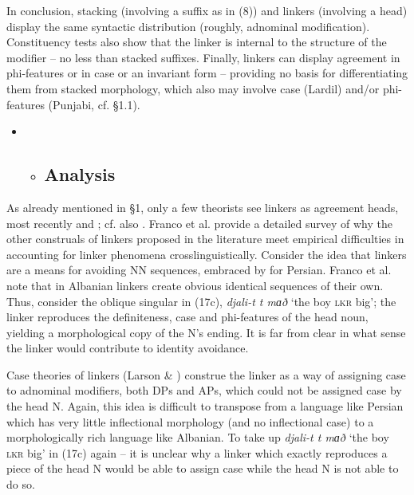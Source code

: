 \documentclass[output=paper]{langsci/langscibook}
\begin{document}
\begin{styleSfondomedioiColorexxi}
In conclusion, stacking (involving a suffix as in (8)) and linkers (involving a head) display the same syntactic distribution (roughly, adnominal modification). Constituency tests also show that the linker is internal to the structure of the modifier – no less than stacked suffixes. Finally, linkers can display agreement in phi-features or in case or an invariant form – providing no basis for differentiating them from stacked morphology, which also may involve case (Lardil) and/or phi-features (Punjabi, cf. §1.1).
\end{styleSfondomedioiColorexxi}

\begin{itemize}
\item \begin{itemize}
\item \subsection{ Analysis} \end{itemize}
\end{itemize}
\begin{styleSfondomedioiColorexxi}
As already mentioned in §1, only a few theorists see linkers as agreement heads, most recently \citet{Philip2012} and \citet{FrancoEtAl2015}; cf. also \citet{Zwart2006}. Franco et al. provide a detailed survey of why the other construals of linkers proposed in the literature meet empirical difficulties in accounting for linker phenomena crosslinguistically. Consider the idea that linkers are a means for avoiding NN sequences, embraced by \citet{Richards2010} for Persian. Franco et al. note that in Albanian linkers create obvious identical sequences of their own. Thus, consider the oblique singular in (17c), \textit{djali-t t mɑð} ‘the boy \textsc{lkr} big’; the linker reproduces the definiteness, case and phi-features of the head noun, yielding a morphological copy of the N’s ending. It is far from clear in what sense the linker would contribute to identity avoidance.
\end{styleSfondomedioiColorexxi}

\begin{styleSfondomedioiColorexxi}
  Case theories of linkers (Larson \& \citealt{Yamakido2008}) construe the linker as a way of assigning case to adnominal modifiers, both DPs and APs, which could not be assigned case by the head N. Again, this idea is difficult to transpose from a language like Persian which has very little inflectional morphology (and no inflectional case) to a morphologically rich language like Albanian. To take up \textit{djali-t t mɑð} ‘the boy \textsc{lkr} big’ in (17c) again – it is unclear why a linker which exactly reproduces a piece of the head N would be able to assign case while the head N is not able to do so.    
\end{styleSfondomedioiColorexxi}
\end{document}
